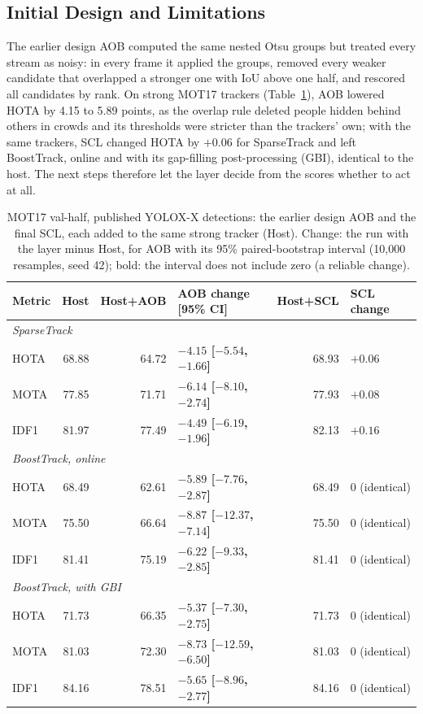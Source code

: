 \subsection{Initial Design and Limitations}\label{sec:scl-prior}
The earlier design AOB computed the same nested Otsu groups but treated every stream as noisy: in every frame it applied the groups, removed every weaker candidate that overlapped a stronger one with IoU above one half, and rescored all candidates by rank. On strong MOT17 trackers (Table~\ref{tab:scl-prior}), AOB lowered HOTA by 4.15 to 5.89 points, as the overlap rule deleted people hidden behind others in crowds and its thresholds were stricter than the trackers' own; with the same trackers, SCL changed HOTA by $+0.06$ for SparseTrack and left BoostTrack, online and with its gap-filling post-processing (GBI), identical to the host. The next steps therefore let the layer decide from the scores whether to act at all.

\begin{table}[tbp]
\centering
\caption{MOT17 val-half, published YOLOX-X detections: the earlier design AOB and the final SCL, each added to the same strong tracker (Host). Change: the run with the layer minus Host, for AOB with its 95\% paired-bootstrap interval (10,000 resamples, seed 42); bold: the interval does not include zero (a reliable change).}
\label{tab:scl-prior}
\begin{tabular}{lrrlrl}
\toprule
Metric & Host & Host+AOB & AOB change [95\% CI] & Host+SCL & SCL change\\
\midrule
\multicolumn{6}{l}{\textit{SparseTrack} \cite{liu2025sparsetrack}}\\
\quad HOTA & 68.88 & 64.72 & \textbf{$-4.15$ [$-5.54$, $-1.66$]} & 68.93 & $+0.06$\\
\quad MOTA & 77.85 & 71.71 & \textbf{$-6.14$ [$-8.10$, $-2.74$]} & 77.93 & $+0.08$\\
\quad IDF1 & 81.97 & 77.49 & \textbf{$-4.49$ [$-6.19$, $-1.96$]} & 82.13 & $+0.16$\\
\multicolumn{6}{l}{\textit{BoostTrack, online} \cite{stanojevic2024boosttrack}}\\
\quad HOTA & 68.49 & 62.61 & \textbf{$-5.89$ [$-7.76$, $-2.87$]} & 68.49 & 0 (identical)\\
\quad MOTA & 75.50 & 66.64 & \textbf{$-8.87$ [$-12.37$, $-7.14$]} & 75.50 & 0 (identical)\\
\quad IDF1 & 81.41 & 75.19 & \textbf{$-6.22$ [$-9.33$, $-2.85$]} & 81.41 & 0 (identical)\\
\multicolumn{6}{l}{\textit{BoostTrack, with GBI} \cite{stanojevic2024boosttrack}}\\
\quad HOTA & 71.73 & 66.35 & \textbf{$-5.37$ [$-7.30$, $-2.75$]} & 71.73 & 0 (identical)\\
\quad MOTA & 81.03 & 72.30 & \textbf{$-8.73$ [$-12.59$, $-6.50$]} & 81.03 & 0 (identical)\\
\quad IDF1 & 84.16 & 78.51 & \textbf{$-5.65$ [$-8.96$, $-2.77$]} & 84.16 & 0 (identical)\\
\bottomrule
\end{tabular}
\end{table}

